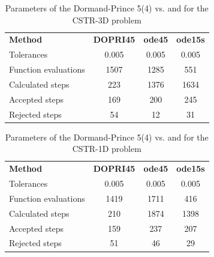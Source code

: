 \begin{table}[H]
    \centering
    \begin{tabular}{@{}l|c|c|c@{}}
    \toprule
    \textbf{Method}      & \multicolumn{1}{c|}{\textbf{DOPRI45}} & \multicolumn{1}{c|}{\textbf{ode45}} & \multicolumn{1}{c}{\textbf{ode15s}} \\
    Tolerances           & 0.005                                 & 0.005                               & 0.005                               \\ \midrule
    Function evaluations & 1507                                  & 1285                                & 551                                 \\
    Calculated steps     & 223                                   & 1376                                & 1634                                \\
    Accepted steps       & 169                                   & 200                                 & 245                                 \\
    Rejected steps       & 54                                    & 12                                  & 31                                  \\ \bottomrule
    \end{tabular}
    \caption{Parameters of the Dormand-Prince 5(4) vs.  and  for the CSTR-3D problem}
    \label{7_6_3D_table}
\end{table}

\begin{table}[H]
    \centering
    \begin{tabular}{@{}l|c|c|c@{}}
    \toprule
    \textbf{Method}      & \multicolumn{1}{c|}{\textbf{DOPRI45}} & \multicolumn{1}{c|}{\textbf{ode45}} & \multicolumn{1}{c}{\textbf{ode15s}} \\
    Tolerances           & 0.005                                 & 0.005                               & 0.005                               \\ \midrule
    Function evaluations & 1419                                  & 1711                                & 416                                 \\
    Calculated steps     & 210                                   & 1874                                & 1398                                \\
    Accepted steps       & 159                                   & 237                                 & 207                                 \\
    Rejected steps       & 51                                    & 46                                  & 29                                  \\ \bottomrule
    \end{tabular}
    \caption{Parameters of the Dormand-Prince 5(4) vs.  and  for the CSTR-1D problem}
    \label{7_6_1D_table}
\end{table}
